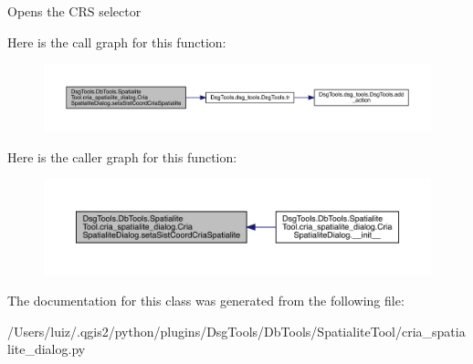 \begin{DoxyVerb}Opens the CRS selector
\end{DoxyVerb}
 Here is the call graph for this function\+:
\nopagebreak
\begin{figure}[H]
\begin{center}
\leavevmode
\includegraphics[width=350pt]{class_dsg_tools_1_1_db_tools_1_1_spatialite_tool_1_1cria__spatialite__dialog_1_1_cria_spatialite_dialog_a8d3587ec231d47e613e7187dfa5b4ab6_cgraph}
\end{center}
\end{figure}
Here is the caller graph for this function\+:
\nopagebreak
\begin{figure}[H]
\begin{center}
\leavevmode
\includegraphics[width=350pt]{class_dsg_tools_1_1_db_tools_1_1_spatialite_tool_1_1cria__spatialite__dialog_1_1_cria_spatialite_dialog_a8d3587ec231d47e613e7187dfa5b4ab6_icgraph}
\end{center}
\end{figure}


The documentation for this class was generated from the following file\+:\begin{DoxyCompactItemize}
\item 
/\+Users/luiz/.\+qgis2/python/plugins/\+Dsg\+Tools/\+Db\+Tools/\+Spatialite\+Tool/cria\+\_\+spatialite\+\_\+dialog.\+py\end{DoxyCompactItemize}
